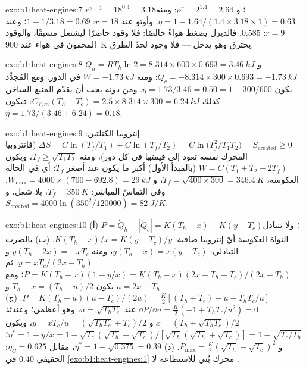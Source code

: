 \begin{solution}{exo:b1:heat-engines:7}
$r^{\gamma-1} = 18^{0.4} = 3.18$؛ و $\rho^\gamma = 2^{1.4} = 2.64$: ومنه $\eta = 1 -
1.64/(1.4 \times 3.18 \times 1) = 0.63$. وأوتو عند $r = 18$: $1 - 1/3.18 = 0.69$؛
وعند $r = 9$: $0.585$. فالديزل يضغط هواءً خالصًا: فلا وقود حاضرًا
ليشتعل مسبقًا، والوقود المحقون في هواء عند \qty{900}{K} يحترق وهو
يدخل --- فلا وجود لحدّ الطرق.
\end{solution}

\begin{solution}{exo:b1:heat-engines:8}
$Q_h = RT_h\ln2 = 8.314 \times 600 \times 0.693 = \qty{3.46}{kJ}$ و $Q_c = -8.314
\times 300 \times 0.693 = \qty{-1.73}{kJ}$: ومنه $W = \qty{-1.73}{kJ}$ في الدور. ومع
المُجدِّد يكون $\eta = 1.73/3.46 = 0.50 = 1 - 300/600$. ومن دونه يجب أن يقدّم
المنبع الساخن كذلك $C_{V,m}(T_h - T_c) = 2.5 \times 8.314 \times 300 =
\qty{6.24}{kJ}$: فيكون $\eta = 1.73/(3.46 + 6.24) = 0.18$.
\end{solution}

\begin{solution}{exo:b1:heat-engines:9}
إنتروبيا الكتلتين: $\Delta S = C\ln(T_f/T_1) + C\ln(T_f/T_2) =
C\ln\bigl(T_f^2/T_1T_2\bigr) = S_{\mathrm{created}} \geq 0$ (فإنتروبيا المحرك نفسه
تعود إلى قيمتها في كل دور)، ومنه $T_f \geq \sqrt{T_1T_2}$، ويكون
$W = C(T_1 + T_2 - 2T_f)$ (بالمبدأ الأول) أكبر ما يكون عند أصغر $T_f$:
أي في الحالة العكوسة، $T_f = \sqrt{400 \times 300} = \qty{346.4}{K}$،
و $W_{\max} = 4000 \times (700 - 692.8) = \qty{29}{kJ}$. وفي التماسّ المباشر: $T_f =
\qty{350}{K}$، بلا شغل، و $S_{\mathrm{created}} = 4000\ln(350^2/120000) =
\qty{82}{J/K}$.
\end{solution}

\begin{solution}{exo:b1:heat-engines:10}
(أ) $P = \dot Q_h - |\dot Q_c| = K(T_h - x) - K(y - T_c)$؛ ولا تتبادل النواة العكوسة
أيّ إنتروبيا صافية: $K(T_h - x)/x = K(y - T_c)/y$. (ب) بالضرب التبادلي:
$y(T_h - x) = x(y - T_c)$، ومنه $y(T_h - 2x) = -xT_c$ و $y = xT_c/(2x - T_h)$.
ثم $P = K(T_h - x)(1 - y/x) = K(T_h - x)(2x - T_h - T_c)/(2x - T_h)$؛ ومع
$u = 2x - T_h$ يكون $T_h - x = (T_h - u)/2$ و $P = K(T_h - u)(u - T_c)/(2u) =
\tfrac{K}{2}[(T_h + T_c) - u - T_hT_c/u]$. (ج) $\dd P/\dd u = \tfrac K2(-1 +
T_hT_c/u^2) = 0$ عند $u = \sqrt{T_hT_c}$، وهو أعظمي؛ وعندئذ $x = (T_h +
\sqrt{T_hT_c})/2$ و $y = xT_c/u = (\sqrt{T_hT_c} + T_c)/2$، ويكون $\eta^\ast = 1 - y/x
= 1 - \sqrt{T_c}(\sqrt{T_h} + \sqrt{T_c})/[\sqrt{T_h}(\sqrt{T_h} + \sqrt{T_c})] = 1 -
\sqrt{T_c/T_h}$؛ و $P_{\max} = \tfrac K2(\sqrt{T_h} - \sqrt{T_c})^2$. (د)
$\eta^\ast = 1 - \sqrt{0.375} = 0.39$، مقابل $\eta_C = 0.625$:  الحقيقي $0.40$
في \cref{exo:b1:heat-engines:1} محرك بُني للاستطاعة لا
.
\end{solution}

